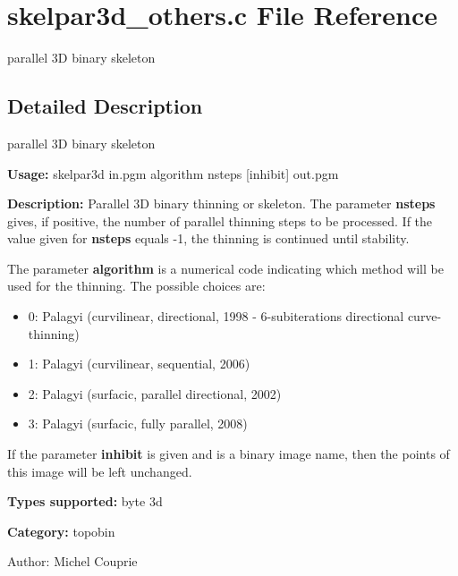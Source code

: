 \section{skelpar3d\_\-others.c File Reference}
\label{skelpar3d__others_8c}
parallel 3D binary skeleton 



\subsection{Detailed Description}
parallel 3D binary skeleton 

{\bf Usage:} skelpar3d in.pgm algorithm nsteps [inhibit] out.pgm

{\bf Description:} Parallel 3D binary thinning or skeleton. The parameter {\bf nsteps} gives, if positive, the number of parallel thinning steps to be processed. If the value given for {\bf nsteps} equals -1, the thinning is continued until stability.

The parameter {\bf algorithm} is a numerical code indicating which method will be used for the thinning. The possible choices are: \begin{itemize}
\item 0: Palagyi (curvilinear, directional, 1998 - 6-subiterations directional curve-thinning) \item 1: Palagyi (curvilinear, sequential, 2006) \item 2: Palagyi (surfacic, parallel directional, 2002) \item 3: Palagyi (surfacic, fully parallel, 2008)\end{itemize}
If the parameter {\bf inhibit} is given and is a binary image name, then the points of this image will be left unchanged.

{\bf Types supported:} byte 3d

{\bf Category:} topobin

\begin{Desc}
\item[Author:]Michel Couprie \end{Desc}
